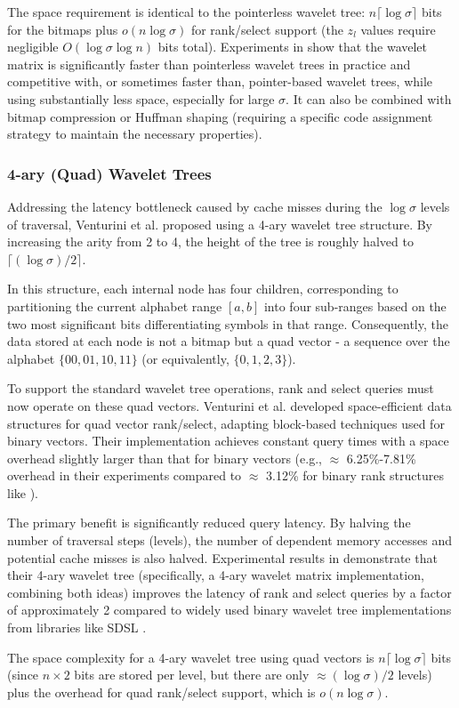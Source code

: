 The space requirement is identical to the pointerless wavelet tree: $n \lceil \log \sigma \rceil$ bits for the bitmaps plus $o(n \log \sigma)$ for rank/select support (the $z_l$ values require negligible $O(\log \sigma \log n)$ bits total). Experiments in \cite{claude2015wavelet} show that the wavelet matrix is significantly faster than pointerless wavelet trees in practice and competitive with, or sometimes faster than, pointer-based wavelet trees, while using substantially less space, especially for large $\sigma$. It can also be combined with bitmap compression or Huffman shaping (requiring a specific code assignment strategy \cite{claude2015wavelet} to maintain the necessary properties).


\subsubsection{4-ary (Quad) Wavelet Trees}
Addressing the latency bottleneck caused by cache misses during the $\log \sigma$ levels of traversal, Venturini et al. \cite{QWT} proposed using a 4-ary wavelet tree structure. By increasing the arity from 2 to 4, the height of the tree is roughly halved to $\lceil (\log \sigma) / 2 \rceil$.

In this structure, each internal node has four children, corresponding to partitioning the current alphabet range $[a,b]$ into four sub-ranges based on the two most significant bits differentiating symbols in that range. Consequently, the data stored at each node is not a bitmap but a quad vector - a sequence over the alphabet $\{00, 01, 10, 11\}$ (or equivalently, $\{0, 1, 2, 3\}$).

To support the standard wavelet tree operations, rank and select queries must now operate on these quad vectors. Venturini et al. \cite{QWT} developed space-efficient data structures for quad vector rank/select, adapting block-based techniques used for binary vectors. Their implementation achieves constant query times with a space overhead slightly larger than that for binary vectors (e.g., $\approx$ 6.25\%-7.81\% overhead in their experiments compared to $\approx$ 3.12\% for binary rank structures like \cite{gonzalez2005practical}).

The primary benefit is significantly reduced query latency. By halving the number of traversal steps (levels), the number of dependent memory accesses and potential cache misses is also halved. Experimental results in \cite{QWT} demonstrate that their 4-ary wavelet tree (specifically, a 4-ary wavelet matrix implementation, combining both ideas) improves the latency of rank and select queries by a factor of approximately 2 compared to widely used binary wavelet tree implementations from libraries like SDSL \cite{gog2014theory}.

The space complexity for a 4-ary wavelet tree using quad vectors is $n \lceil \log \sigma \rceil$ bits (since $n \times 2$ bits are stored per level, but there are only $\approx (\log \sigma)/2$ levels) plus the overhead for quad rank/select support, which is $o(n \log \sigma)$.
